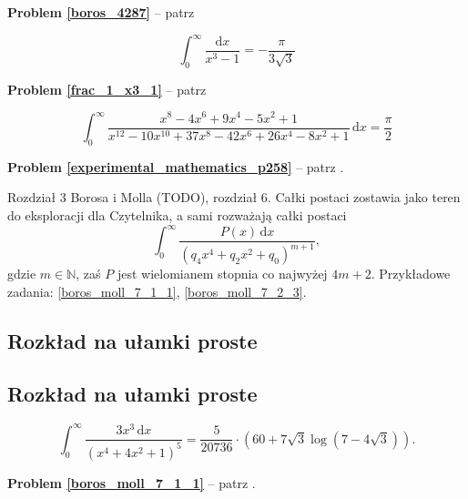 \textbf{Problem \ref{boros_4287}} -- patrz \cite[s. 48-60]{boros04}

\begin{problem}
\label{frac_1_x3_1}%
\begin{equation}
    \int_0^\infty \frac{\mathrm{d}x}{x^3 - 1} = - \frac{\pi}{3\sqrt{3}}
\end{equation}
\end{problem}

\textbf{Problem \ref{frac_1_x3_1}} -- patrz \cite[s. 22]{nahin15}

\begin{problem}
    \label{experimental_mathematics_p258}%
\begin{equation}
    \int_0^\infty \frac{x^8-4x^6+9x^4-5x^2+1}{x^{12}-10x^{10}+37x^8-42x^6+26x^4-8x^2+1} \,\mathrm{d}x = \frac{\pi}{2}
\end{equation}
\end{problem}

\textbf{Problem \ref{experimental_mathematics_p258}} -- patrz \cite[s. 258]{bailey07}.

Rozdział 3 Borosa i Molla (TODO), rozdział 6. Całki postaci zostawia jako teren do eksploracji dla Czytelnika, a sami rozważają całki postaci
\begin{equation}
    \int_0^\infty \frac{P(x) \,\mathrm{d}x}{(q_4 x^4 + q_2 x^2 + q_0)^{m+1}},
\end{equation}
gdzie $m \in \mathbb N$, zaś $P$ jest wielomianem stopnia co najwyżej $4m + 2$.
Przykładowe zadania: \ref{boros_moll_7_1_1}, \ref{boros_moll_7_2_3}.

\subsection{Rozkład na ułamki proste}
\subsection{Rozkład na ułamki proste}

\begin{problem_with_solution}
    \label{boros_moll_7_1_1}
\begin{equation}
    \int_0^\infty \frac{3x^3 \,\mathrm{d}x}{(x^4 + 4x^2 + 1)^5} = \frac{5}{20736} \cdot \left(60 + 7 \sqrt{3} \log \left(7 - 4 \sqrt {3}\right)\right).
\end{equation}
\end{problem_with_solution}

\textbf{Problem \ref{boros_moll_7_1_1}} -- patrz \cite[s. 138]{boros04}.

%